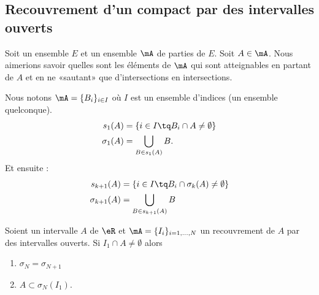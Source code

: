 \subsection{Recouvrement d'un compact par des intervalles ouverts}

Soit un ensemble \( E\) et un ensemble \( \mA\) de parties de \( E\). Soit \( A\in \mA\). Nous aimerions savoir quelles sont les éléments de \( \mA\) qui sont atteignables en partant de \( A\) et en ne «sautant» que d'intersections en intersections.

Nous notons \( \mA=\{ B_i \}_{i\in I}\) où \( I\) est un ensemble d'indices (un ensemble quelconque).
\begin{subequations}
    \begin{align}
        s_1(A)&=\{  i\in I\tq B_i\cap A\neq \emptyset   \}\\
        \sigma_1(A)&=\bigcup_{B\in s_1(A)}B.
    \end{align}
\end{subequations}
Et ensuite :
\begin{subequations}
    \begin{align}
        s_{k+1}(A)&=\{ i\in I\tq B_i\cap \sigma_k(A)\neq \emptyset \}\\
        \sigma_{k+1}(A)&=\bigcup_{B\in s_{k+1}(A)}B
    \end{align}
\end{subequations}

\begin{lemma}
    Soient un intervalle \( A\) de \( \eR\) et \( \mA=\{ I_i \}_{i=1,\ldots, N}\) un recouvrement de \( A\) par des intervalles ouverts. Si \( I_1\cap A\neq \emptyset\) alors
    \begin{enumerate}
        \item
            \( \sigma_{N}=\sigma_{N+1}\)
        \item
            \( A\subset \sigma_N(I_1)\).
    \end{enumerate}
\end{lemma}


